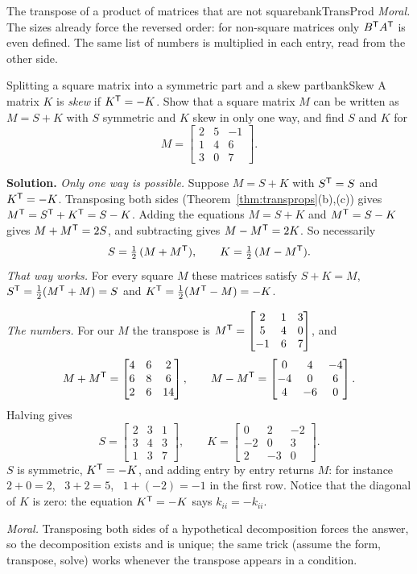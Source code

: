 \documentclass[11pt]{article}
\begin{document}
\begin{exmp}{The transpose of a product of matrices that are not square}{bankTransProd}
\emph{Moral.} The sizes already force the reversed order: for non-square matrices only $B^{\mathsf T} A^{\mathsf T}$ is even defined. The same list of numbers is multiplied in each entry, read from the other side.
\end{exmp}

\begin{exmp}{Splitting a square matrix into a symmetric part and a skew part}{bankSkew}
A matrix $K$ is \emph{skew} if $K^{\mathsf T}=-K$. Show that a square matrix $M$ can be written as $M=S+K$ with $S$ symmetric and $K$ skew in only one way, and find $S$ and $K$ for
\[
M=\begin{bmatrix}2&5&-1\\1&4&6\\3&0&7\end{bmatrix}.
\]

\textbf{Solution.} \emph{Only one way is possible.} Suppose $M=S+K$ with $S^{\mathsf T}=S$ and $K^{\mathsf T}=-K$. Transposing both sides (Theorem~\ref{thm:transprops}(b),(c)) gives $M^{\mathsf T}=S^{\mathsf T}+K^{\mathsf T}=S-K$. Adding the equations $M=S+K$ and $M^{\mathsf T}=S-K$ gives $M+M^{\mathsf T}=2S$, and subtracting gives $M-M^{\mathsf T}=2K$. So necessarily
\[
S=\tfrac12\,(M+M^{\mathsf T}),\qquad K=\tfrac12\,(M-M^{\mathsf T}).
\]
\emph{That way works.} For every square $M$ these matrices satisfy $S+K=M$, \ $S^{\mathsf T}=\tfrac12(M^{\mathsf T}+M)=S$ and $K^{\mathsf T}=\tfrac12(M^{\mathsf T}-M)=-K$.

\emph{The numbers.} For our $M$ the transpose is $M^{\mathsf T}=\begin{bmatrix}2&1&3\\5&4&0\\-1&6&7\end{bmatrix}$, and
\[
M+M^{\mathsf T}=\begin{bmatrix}4&6&2\\6&8&6\\2&6&14\end{bmatrix},\qquad M-M^{\mathsf T}=\begin{bmatrix}0&4&-4\\-4&0&6\\4&-6&0\end{bmatrix}.
\]
Halving gives
\[
S=\begin{bmatrix}2&3&1\\3&4&3\\1&3&7\end{bmatrix},\qquad K=\begin{bmatrix}0&2&-2\\-2&0&3\\2&-3&0\end{bmatrix}.
\]
$S$ is symmetric, $K^{\mathsf T}=-K$, and adding entry by entry returns $M$: for instance $2+0=2$, \ $3+2=5$, \ $1+(-2)=-1$ in the first row. Notice that the diagonal of $K$ is zero: the equation $K^{\mathsf T}=-K$ says $k_{ii}=-k_{ii}$.

\emph{Moral.} Transposing both sides of a hypothetical decomposition forces the answer, so the decomposition exists and is unique; the same trick (assume the form, transpose, solve) works whenever the transpose appears in a condition.
\end{exmp}
\end{document}
